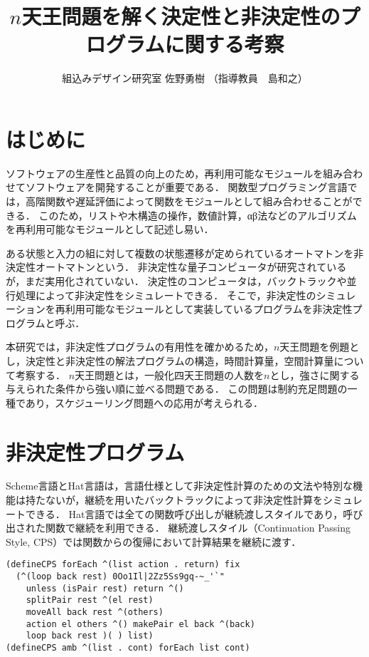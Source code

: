 \documentclass[10pt,a4j,twocolumn,oneside]{jsarticle}
\title{
  {\bf $n$天王問題を解く決定性と非決定性のプログラムに関する考察}
}
\author{組込みデザイン研究室  佐野勇樹 \quad （指導教員　島和之）}
\date{}
\begin{document}
\maketitle
\thispagestyle{empty}

\section{はじめに}

ソフトウェアの生産性と品質の向上のため，再利用可能なモジュールを組み合わせてソフトウェアを開発することが重要である．
関数型プログラミング言語では，高階関数や遅延評価によって関数をモジュールとして組み合わせることができる．
このため，リストや木構造の操作，数値計算，αβ法などのアルゴリズムを再利用可能なモジュールとして記述し易い\cite{Hughes1989}．

ある状態と入力の組に対して複数の状態遷移が定められているオートマトンを非決定性オートマトンという\cite{Fujiwara2015}．
非決定性な量子コンピュータが研究されているが，まだ実用化されていない．
決定性のコンピュータは，バックトラックや並行処理によって非決定性をシミュレートできる．
そこで，非決定性のシミュレーションを再利用可能なモジュールとして実装しているプログラムを非決定性プログラムと呼ぶ．

本研究では，非決定性プログラムの有用性を確かめるため，$n$天王問題を例題とし，決定性と非決定性の解法プログラムの構造，時間計算量，空間計算量について考察する\cite{Sano202010}．
$n$天王問題とは，一般化四天王問題\cite{Yokomoto201910}の人数を$n$とし，強さに関する与えられた条件から強い順に並べる問題である．
この問題は制約充足問題の一種であり，スケジューリング問題への応用が考えられる．

\section{非決定性プログラム}

Scheme言語とHat言語は，言語仕様として非決定性計算のための文法や特別な機能は持たないが，継続を用いたバックトラックによって非決定性計算をシミュレートできる．
Hat言語では全ての関数呼び出しが継続渡しスタイルであり，呼び出された関数で継続を利用できる．
継続渡しスタイル（Continuation Passing Style, CPS）では関数からの復帰において計算結果を継続に渡す\cite{Sussman1998,Reynolds1993}．


\begin{table}[b]
\begin{lstlisting}[caption=Hat言語における非決定性計算のための関数定義,label=functions-for-nondeterministic-in-hat,frame=single,xleftmargin=3mm,xrightmargin=0mm]
(defineCPS forEach ^(list action . return) fix
  (^(loop back rest) 0Oo1Il|2Zz5Ss9gq-~_'`"
    unless (isPair rest) return ^()
    splitPair rest ^(el rest)
    moveAll back rest ^(others)
    action el others ^() makePair el back ^(back)
    loop back rest )( ) list)
(defineCPS amb ^(list . cont) forEach list cont)
\end{lstlisting}
\end{table}
\end{document}
